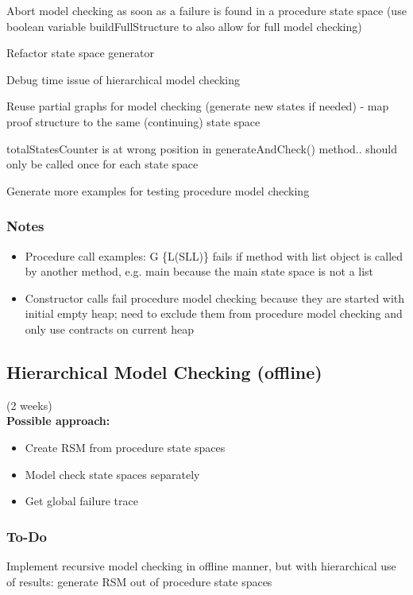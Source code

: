 \documentclass[a4paper,12pt]{article}
\newcommand{\cmark}{\ding{51}}%
\newcommand{\done}{\rlap{$\square$}{\raisebox{2pt}{\large\hspace{1pt}\cmark}}%
\hspace{-2.5pt}}
\begin{document}
\begin{todolist}
	\item Abort model checking as soon as a failure is found in a procedure state space (use boolean variable buildFullStructure to also allow for full model checking)	
	\item Refactor state space generator
	\item Debug time issue of hierarchical model checking
	\item Reuse partial graphs for model checking (generate new states if needed) - map proof structure to the same (continuing) state space
	\item totalStatesCounter is at wrong position in generateAndCheck() method.. should only be called once for each state space	
	\item Generate more examples for testing procedure model checking 
\end{todolist}

\subsubsection{Notes}

\begin{itemize}
	\item Procedure call examples: G \{L(SLL)\} fails if method with list object is called by another method, e.g. main because the main state space is not a list
	\item Constructor calls fail procedure model checking because they are started with initial empty heap; need to exclude them from procedure model checking and only use contracts on current heap
\end{itemize}

\subsection{Hierarchical Model Checking (offline)}
(2 weeks)\\

\textbf{Possible approach:}
\begin{itemize}
	\item Create RSM from procedure state spaces
	\item Model check state spaces separately
	\item Get global failure trace
\end{itemize}

\subsubsection{To-Do}
\begin{todolist}
	\item[\done] Implement recursive model checking in offline manner, but with hierarchical use of results: generate RSM out of procedure state spaces	
\end{todolist}
\end{document}
